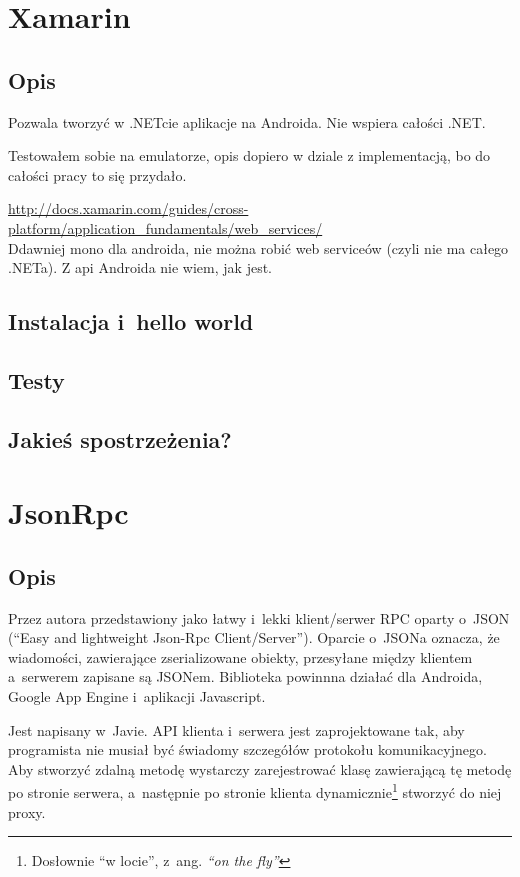 \section{Xamarin}
\subsection{Opis}
Pozwala tworzyć w .NETcie aplikacje na Androida. Nie wspiera całości .NET.

Testowałem sobie na emulatorze, opis dopiero w dziale z implementacją, bo do całości pracy to się przydało.

\url{http://docs.xamarin.com/guides/cross-platform/application_fundamentals/web_services/}\\
Ddawniej mono dla androida, nie można robić web serviceów (czyli nie ma całego .NETa). Z api Androida nie wiem, jak jest.

\subsection{Instalacja i~hello world}
\subsection{Testy}
\subsection{Jakieś spostrzeżenia?}


\section{JsonRpc}
\subsection{Opis}
Przez autora przedstawiony jako łatwy i~lekki klient/serwer RPC oparty o~JSON (``Easy and lightweight Json-Rpc Client/Server'')\cite{json-rpc}.
Oparcie o~JSONa oznacza, że wiadomości, zawierające zserializowane obiekty, przesyłane między klientem a~serwerem zapisane są JSONem. Biblioteka powinnna działać dla Androida, Google App Engine i~aplikacji Javascript.

Jest napisany w~Javie.
API klienta i~serwera jest zaprojektowane tak, aby programista nie musiał być świadomy szczegółów protokołu komunikacyjnego.
Aby stworzyć zdalną metodę wystarczy zarejestrować klasę zawierającą tę metodę po stronie serwera, a~następnie po stronie klienta dynamicznie\footnote{Dosłownie ``w locie'', z~ang. \emph{``on the fly''}} stworzyć do niej proxy.

